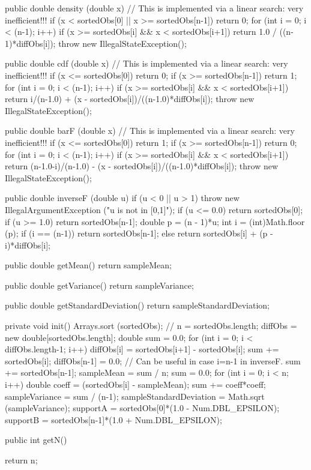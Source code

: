 \begin{code}\begin{hide}

   public double density (double x) {
      // This is implemented via a linear search: very inefficient!!!
      if (x < sortedObs[0] || x >= sortedObs[n-1])
         return 0;
      for (int i = 0; i < (n-1); i++) {
         if (x >= sortedObs[i] && x < sortedObs[i+1])
            return 1.0 / ((n-1)*diffObs[i]);
      }
      throw new IllegalStateException();
   }

   public double cdf (double x) {
      // This is implemented via a linear search: very inefficient!!!
      if (x <= sortedObs[0])
         return 0;
      if (x >= sortedObs[n-1])
         return 1;
      for (int i = 0; i < (n-1); i++) {
         if (x >= sortedObs[i] && x < sortedObs[i+1])
            return i/(n-1.0) + (x - sortedObs[i])/((n-1.0)*diffObs[i]);
      }
      throw new IllegalStateException();
   }

   public double barF (double x) {
      // This is implemented via a linear search: very inefficient!!!
      if (x <= sortedObs[0])
         return 1;
      if (x >= sortedObs[n-1])
         return 0;
      for (int i = 0; i < (n-1); i++) {
         if (x >= sortedObs[i] && x < sortedObs[i+1])
            return (n-1.0-i)/(n-1.0) - (x - sortedObs[i])/((n-1.0)*diffObs[i]);
      }
      throw new IllegalStateException();
   }

   public double inverseF (double u) {
      if (u < 0 || u > 1)
         throw new IllegalArgumentException ("u is not in [0,1]");
      if (u <= 0.0)
         return sortedObs[0];
      if (u >= 1.0)
         return sortedObs[n-1];
      double p = (n - 1)*u;
      int i = (int)Math.floor (p);
      if (i == (n-1))
         return sortedObs[n-1];
      else
         return sortedObs[i] + (p - i)*diffObs[i];
   }

   public double getMean() {
      return sampleMean;
   }

   public double getVariance() {
      return sampleVariance;
   }

   public double getStandardDeviation() {
      return sampleStandardDeviation;
   }

   private void init() {
      Arrays.sort (sortedObs);
      // n = sortedObs.length;
      diffObs = new double[sortedObs.length];
      double sum = 0.0;
      for (int i = 0; i < diffObs.length-1; i++) {
         diffObs[i] = sortedObs[i+1] - sortedObs[i];
         sum += sortedObs[i];
      }
      diffObs[n-1] = 0.0;  // Can be useful in case i=n-1 in inverseF.
      sum += sortedObs[n-1];
      sampleMean = sum / n;
      sum = 0.0;
      for (int i = 0; i < n; i++) {
         double coeff = (sortedObs[i] - sampleMean);
         sum += coeff*coeff;
      }
      sampleVariance = sum / (n-1);
      sampleStandardDeviation = Math.sqrt (sampleVariance);
      supportA = sortedObs[0]*(1.0 - Num.DBL_EPSILON);
      supportB = sortedObs[n-1]*(1.0 + Num.DBL_EPSILON);
   }\end{hide}

   public int getN()\begin{hide} {
      return n;
   }\end{hide}
\end{code}
